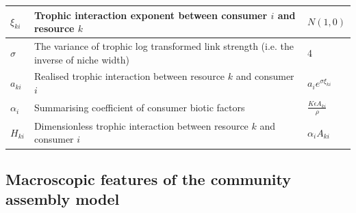 \documentclass[a4paper]{report}
\begin{document}
\begin{table}[H]
\begin{tabular}{lll}
\hline
$\xi_{ki}$   & Trophic interaction exponent between consumer $i$ and resource $k$                                                                                                                                                                  & $N(1,0)$                       \\
\hline
$\sigma$   & The variance of trophic log transformed link strength (i.e. the inverse of niche width)                                                                                                 & 4                              \\
\hline
$a_{ki}$     & Realised trophic interaction between resource $k$ and consumer $i$                                                                                                                                                                  & $a_i e^{\sigma \xi_{ki}}$         \\
\hline
$\alpha_i$ & Summarising coefficient of consumer biotic factors                                                                                                                                                                              & $\frac{K \epsilon A_{ki}}{\rho}$ \\
\hline
$H_{ki}$     & Dimensionless trophic interaction between resource $k$ and consumer $i$                                                                                                                                                         & $\alpha_i A_{ki}$               
\end{tabular}
\end{table}

\subsection{Macroscopic features of the community assembly model}
\end{document}
